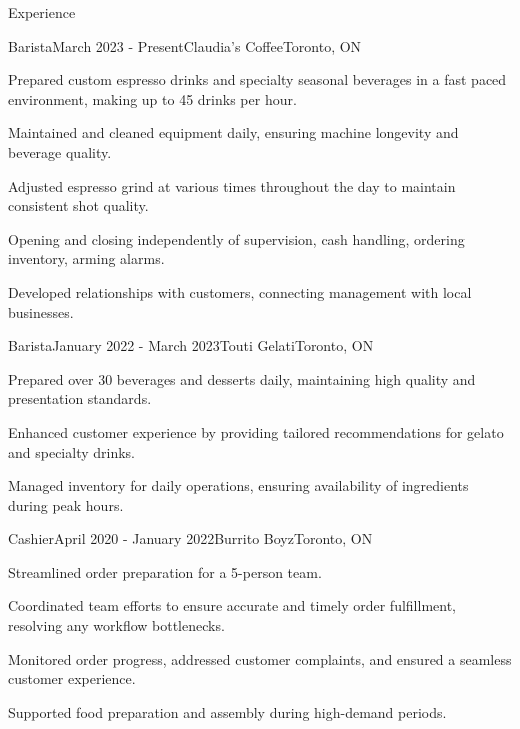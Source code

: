 \documentclass[
	11pt, %
]{resume} %
\begin{document}
\begin{rSection}{Experience}

	\begin{rSubsection}{Barista}{March 2023 - Present}{Claudia's Coffee}{Toronto, ON}
		\item Prepared custom espresso drinks and specialty seasonal beverages in a fast paced environment, making up to 45 drinks per hour.
		\item Maintained and cleaned equipment daily, ensuring machine longevity and beverage quality.
		\item Adjusted espresso grind at various times throughout the day to maintain consistent shot quality.
		\item Opening and closing independently of supervision, cash handling, ordering inventory, arming alarms.
		\item Developed relationships with customers, connecting management with local businesses.
	\end{rSubsection}


	\begin{rSubsection}{Barista}{January 2022 - March 2023}{Touti Gelati}{Toronto, ON}
		\item Prepared over 30 beverages and desserts daily, maintaining high quality and presentation standards.
		\item Enhanced customer experience by providing tailored recommendations for gelato and specialty drinks.
		\item Managed inventory for daily operations, ensuring availability of ingredients during peak hours.
	\end{rSubsection}


	\begin{rSubsection}{Cashier}{April 2020 - January 2022}{Burrito Boyz}{Toronto, ON}
		\item Streamlined order preparation for a 5-person team.
		\item Coordinated team efforts to ensure accurate and timely order fulfillment, resolving any workflow bottlenecks.
		\item Monitored order progress, addressed customer complaints, and ensured a seamless customer experience.
		\item Supported food preparation and assembly during high-demand periods.
	\end{rSubsection}


\end{rSection}
\end{document}
